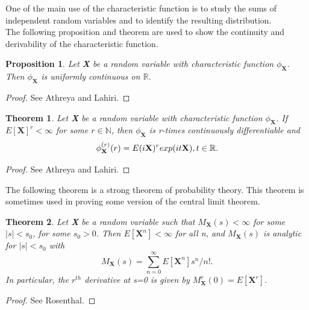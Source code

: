 \documentclass[12pt,travaildirige,nobabel, twoside]{dms}
\numberwithin{equation}{section}
\numberwithin{table}{chapter}
\numberwithin{figure}{chapter}
\newtheorem{proposition}{Proposition}[section]
\newtheorem{theorem}{Theorem}[section]
\begin{document}
One of the main use of the characteristic function is to study the sums of independent random variables and to identify the resulting distribution.\\

The following proposition and theorem are used to show the continuity and derivability of the characteristic function.

\begin{proposition}
Let \textbf{X} be a random variable with characteristic function $\phi_\textbf{X}$. Then $\phi_\textbf{X}$ is uniformly continuous on $\mathbb{R}$\nocite{proba}.
\end{proposition}

\begin{proof}
See Athreya and Lahiri\citep{proba}.
\end{proof}


\begin{theorem}
Let \textbf{X} be a random variable with characteristic function $\phi_\textbf{X}$. If $E[\textbf{X}]^r<\infty$ for some $r\in\mathbb{N}$, then $\phi_\textbf{X}$ is r-times continuously differentiable and 
\begin{equation}
\phi_\textbf{X}^{(r)}(r)=E(i\textbf{X})^r exp(it\textbf{X}), t\in\mathbb{R}\text{\nocite{proba}.}
\end{equation}
\end{theorem}

\begin{proof}
See Athreya and Lahiri\citep{proba}.
\end{proof}

The following theorem is a strong theorem of probability theory. This theorem is sometimes used in proving some version of the central limit theorem. \\

\begin{theorem}
Let \textbf{X} be a random variable such that $M_\textbf{X} (s)<\infty$ for some $|s|<s_0$, for some $s_0>0$. Then $E[\textbf{X}^n]<\infty$ for all n, and $M_\textbf{X} (s)$ is analytic for $|s|<s_0$ with
\begin{equation}
M_{\textbf{X}}(s)=\sum^\infty_{n=0}E[\textbf{X}^n]s^n/n!.
\end{equation}
In particular, the $r^{th}$ derivative at s=0 is given by $M_{\textbf{X}}^{r}(0)=E[\textbf{X}^r]$\nocite{rigprob}.
\end{theorem}

\begin{proof}
See Rosenthal\citep{rigprob}.
\end{proof}
\end{document}
